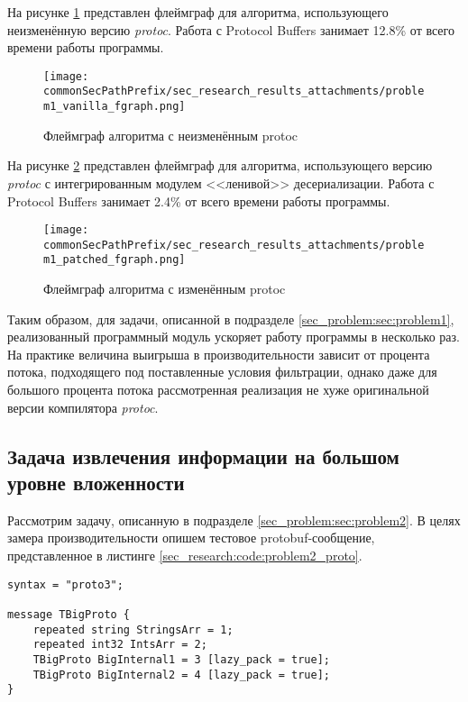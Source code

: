 На рисунке \ref{fig:problem1_vanilla_fgraph} представлен флеймграф для алгоритма, использующего неизменённую версию \textit{protoc}. 
Работа с Protocol Buffers занимает 12.8\% от всего времени работы программы.

\begin{figure}[H]
    \centering
    \texttt{[image: \\commonSecPathPrefix/sec\_research\_results\_attachments/problem1\_vanilla\_fgraph.png]}
    \caption{Флеймграф алгоритма с неизменённым protoc}
    \label{fig:problem1_vanilla_fgraph}
\end{figure}

На рисунке \ref{fig:problem1_patched_fgraph} представлен флеймграф для алгоритма, использующего версию \textit{protoc} с интегрированным модулем <<ленивой>> десериализации. 
Работа с Protocol Buffers занимает 2.4\% от всего времени работы программы.

\begin{figure}[H]
    \centering
    \texttt{[image: \\commonSecPathPrefix/sec\_research\_results\_attachments/problem1\_patched\_fgraph.png]}
    \caption{Флеймграф алгоритма с изменённым protoc}
    \label{fig:problem1_patched_fgraph}
\end{figure}

Таким образом, для задачи, описанной в подразделе \ref{sec_problem:sec:problem1}, реализованный программный модуль ускоряет работу программы в несколько раз.
На практике величина выигрыша в производительности зависит от процента потока, подходящего под поставленные условия фильтрации, однако даже для большого процента потока
рассмотренная реализация не хуже оригинальной версии компилятора \textit{protoc}.

\subsection{Задача извлечения информации на большом уровне вложенности}

Рассмотрим задачу, описанную в подразделе \ref{sec_problem:sec:problem2}.
В целях замера производительности опишем тестовое protobuf-сообщение, представленное в листинге \ref{sec_research:code:problem2_proto}.

\begin{lstlisting}[style=CodeListing, captionpos=b, caption={Тестовое protobuf-сообщение}, label=sec_research:code:problem2_proto]
syntax = "proto3";

message TBigProto {
    repeated string StringsArr = 1;
    repeated int32 IntsArr = 2;
    TBigProto BigInternal1 = 3 [lazy_pack = true];
    TBigProto BigInternal2 = 4 [lazy_pack = true];
}
\end{lstlisting}

